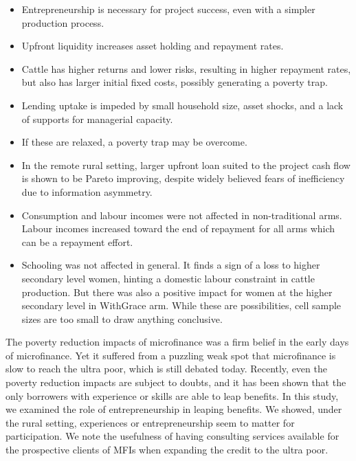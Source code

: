 \begin{mdframed}[style={SecItemize}, frametitle={Conclusion}]
\begin{itemize}
\vspace{1.0ex}\setlength{\itemsep}{1.0ex}\setlength{\baselineskip}{12pt}
\item	Entrepreneurship is necessary for project success, even with a simpler production process.
\item	Upfront liquidity increases asset holding and repayment rates.
\item	Cattle has higher returns and lower risks, resulting in higher repayment rates, but also has larger initial fixed costs, possibly generating a poverty trap.
\item	Lending uptake is impeded by small household size, asset shocks, and a lack of supports for managerial capacity.
\item	If these are relaxed, a poverty trap may be overcome.
\item	In the remote rural setting, larger upfront loan suited to the project cash flow is shown to be Pareto improving, despite widely believed fears of inefficiency due to information asymmetry.
\item	Consumption and labour incomes were not affected in non-\textsf{traditional} arms. Labour incomes increased toward the end of repayment for all arms which can be a repayment effort.
\item	Schooling was not affected in general. It finds a sign of a loss to higher secondary level women, hinting a domestic labour constraint in cattle production. But there was also a positive impact for women at the higher secondary level in \textsf{WithGrace} arm. While these are possibilities, cell sample sizes are too small to draw anything conclusive.
\end{itemize}
\end{mdframed}

	The poverty reduction impacts of microfinance was a firm belief in the early days of microfinance. Yet it suffered from a puzzling weak spot that microfinance is slow to reach the ultra poor, which is still debated today. Recently, even the poverty reduction impacts are subject to doubts, and it has been shown that the only borrowers with experience or skills are able to leap benefits. In this study, we examined the role of entrepreneurship in leaping benefits. We showed, under the rural setting, experiences or entrepreneurship seem to matter for participation. We note the usefulness of having consulting services available for the prospective clients of MFIs when expanding the credit to the ultra poor. 

